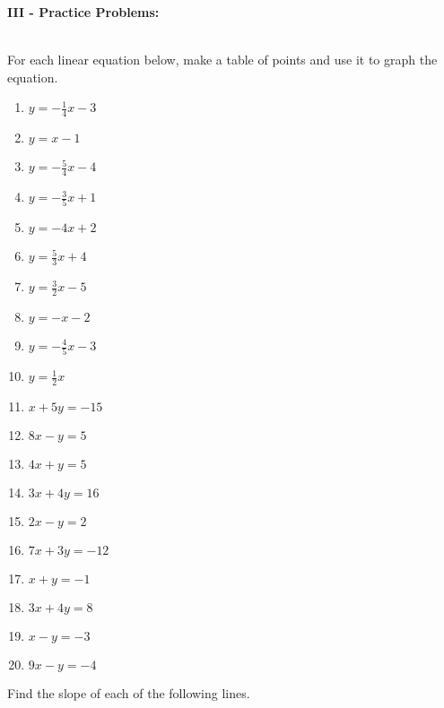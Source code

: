 \documentclass[12pt]{article}
\theoremstyle{definition}
\begin{document}
{\bf III - Practice Problems:}\\
\ \par
For each linear equation below, make a table of points and use it to graph the equation.
\begin{multicols}{4}
 \begin{enumerate}
	\item $y = - \frac{1}{4} x - 3$
  \item $y = x - 1$
  \item $y = - \frac{5}{4} x - 4$
  \item $y = - \frac{3}{5} x + 1$
  \item $y = - 4 x + 2$
  \item $y = \frac{5}{3} x + 4$
  \item $y = \frac{3}{2} x - 5$
  \item $y = - x - 2$
  \item $y = - \frac{4}{5} x - 3$
  \item $y = \frac{1}{2} x$
  \item $x + 5 y = - 15$
  \item $8 x - y = 5$
  \item $4 x + y = 5$
  \item $3 x + 4 y = 16$
  \item $2 x - y = 2$
  \item $7 x + 3 y = - 12$
  \item $x + y = - 1$
  \item $3 x + 4 y = 8$
  \item $x - y = - 3$
  \item $9 x - y = - 4$
 \end{enumerate}
\end{multicols}
Find the slope of each of the following lines.
\end{document}
